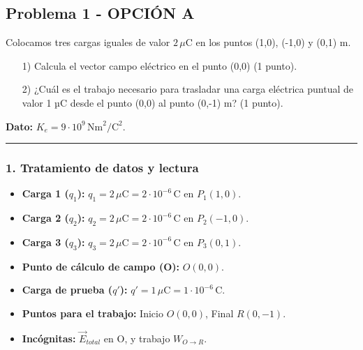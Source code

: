 \subsection{Problema 1 - OPCIÓN A}
\label{subsec:4A_2008_jun_ord}
\begin{cajaenunciado}
Colocamos tres cargas iguales de valor $2\,\mu\text{C}$ en los puntos (1,0), (-1,0) y (0,1) m.
\begin{enumerate}
    \item[1)] Calcula el vector campo eléctrico en el punto (0,0) (1 punto).
    \item[2)] ¿Cuál es el trabajo necesario para trasladar una carga eléctrica puntual de valor 1 µC desde el punto (0,0) al punto (0,-1) m? (1 punto).
\end{enumerate}
\textbf{Dato:} $K_{e}=9\cdot10^{9}\,\text{Nm}^2/\text{C}^2$.
\end{cajaenunciado}
\hrule

\subsubsection*{1. Tratamiento de datos y lectura}
\begin{itemize}
    \item \textbf{Carga 1 ($q_1$):} $q_1 = 2\,\mu\text{C} = 2\cdot10^{-6}\,\text{C}$ en $P_1(1,0)$.
    \item \textbf{Carga 2 ($q_2$):} $q_2 = 2\,\mu\text{C} = 2\cdot10^{-6}\,\text{C}$ en $P_2(-1,0)$.
    \item \textbf{Carga 3 ($q_3$):} $q_3 = 2\,\mu\text{C} = 2\cdot10^{-6}\,\text{C}$ en $P_3(0,1)$.
    \item \textbf{Punto de cálculo de campo (O):} $O(0,0)$.
    \item \textbf{Carga de prueba ($q'$):} $q' = 1\,\mu\text{C} = 1\cdot10^{-6}\,\text{C}$.
    \item \textbf{Puntos para el trabajo:} Inicio $O(0,0)$, Final $R(0,-1)$.
    \item \textbf{Incógnitas:} $\vec{E}_{total}$ en O, y trabajo $W_{O \to R}$.
\end{itemize}


